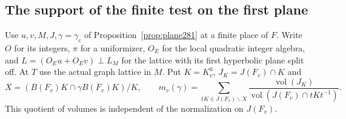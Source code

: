 \documentclass[a4paper,11pt]{article}
\theoremstyle{definition}
\theoremstyle{remark}
\numberwithin{equation}{section}
\begin{document}
\subsection{The support of the finite test on the first plane}\label{nav:VI-48}
Use \(u,v,M,J,\gamma=\gamma_c\) of Proposition~\ref{prop:plane281}
at a finite place of \(F\). Write \(O\) for its integers,
\(\pi\) for a uniformizer, \(O_E\) for the local quadratic
integer algebra, and \(L=(O_Eu+O_Ev)\perp L_M\)
for the lattice with its first hyperbolic plane split off.
At \(T\) use the actual
graph lattice in \(M\). Put \(K=K_v^0\), \(J_K=J(F_v)\cap K\)
and
\[
 X=(B(F_v)K\cap\gamma B(F_v)K)/K,\qquad
 m_v(\gamma)=\sum_{tK\in J(F_v)\backslash X}
  \frac{\operatorname{vol}(J_K)}
       {\operatorname{vol}(J(F_v)\cap tKt^{-1})}.
\]
This quotient of volumes is independent of the normalization
on \(J(F_v)\).
\end{document}
